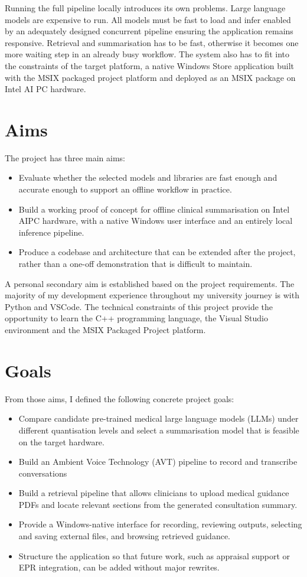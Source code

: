 Running the full pipeline locally introduces its own problems. Large language models are expensive to run. All models must be fast to load and infer enabled by an adequately designed concurrent pipeline ensuring the application remains responsive. Retrieval and summarisation has to be fast, otherwise it becomes one more waiting step in an already busy workflow. The system also has to fit into the constraints of the target platform, a native Windows Store application built with the MSIX packaged project platform and deployed as an MSIX package on Intel AI PC hardware.

\section{Aims}
The project has three main aims:

\begin{itemize}
    \item Evaluate whether the selected models and libraries are fast enough and accurate enough to support an offline workflow in practice.
    \item Build a working proof of concept for offline clinical summarisation on Intel AIPC hardware, with a native Windows user interface and an entirely local inference pipeline.
    \item Produce a codebase and architecture that can be extended after the project, rather than a one-off demonstration that is difficult to maintain.
\end{itemize}

A personal secondary aim is established based on the project requirements. The majority of my development experience throughout my university journey is with Python and VSCode. The technical constraints of this project provide the opportunity to learn the C++ programming language, the Visual Studio environment and the MSIX Packaged Project platform. 

\section{Goals}
From those aims, I defined the following concrete project goals:

\begin{itemize}
    \item Compare candidate pre-trained medical large language models (LLMs) under different quantisation levels and select a summarisation model that is feasible on the target hardware.
    \item Build an Ambient Voice Technology (AVT) pipeline to record and transcribe conversations
    \item Build a retrieval pipeline that allows clinicians to upload medical guidance PDFs and locate relevant sections from the generated consultation summary.
    \item Provide a Windows-native interface for recording, reviewing outputs, selecting and saving external files, and browsing retrieved guidance.
    \item Structure the application so that future work, such as appraisal support or EPR integration, can be added without major rewrites.
\end{itemize}

